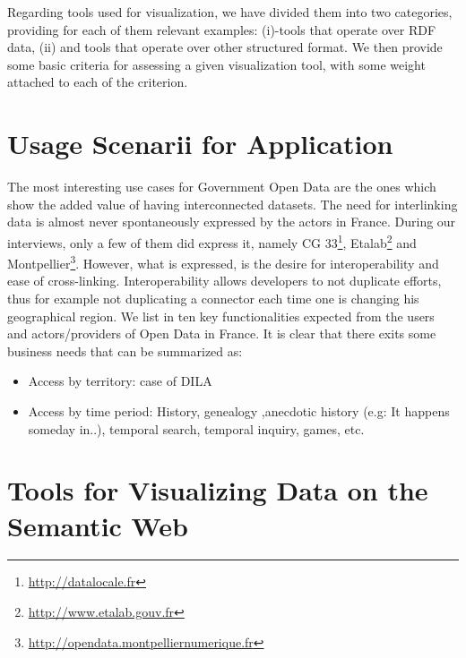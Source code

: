 \documentclass[a4paper,11pt]{report}
\begin{document}
Regarding tools used for visualization, we have divided them into two categories, providing for each of them relevant examples: (i)-tools that operate over RDF data, (ii) and tools that operate over other structured format. We then provide some basic criteria for assessing a given visualization tool, with some weight attached to each of the criterion. 


 \section{Usage Scenarii for Application}
 The most interesting use cases for Government Open Data are the ones which show the added value of having interconnected datasets. The need for interlinking data is almost never spontaneously expressed by the actors in France. During our interviews, only a few of them did express it, namely CG 33\footnote{\url{http://datalocale.fr}}, Etalab\footnote{\url{http://www.etalab.gouv.fr}} and Montpellier\footnote{\url{http://opendata.montpelliernumerique.fr}}. However, what is expressed, is the desire for interoperability and ease of cross-linking. Interoperability allows developers to not duplicate efforts, thus for example not duplicating a connector each time one is changing his geographical region. We list in \cite{deliverable2012a} ten key functionalities expected from the users and actors/providers of Open Data in France. It is clear that there exits some business needs that can be summarized as:
\begin{itemize}
\item Access by territory: case of DILA
\item Access by time period: History, genealogy ,anecdotic history (e.g: It happens someday in..), temporal search, temporal inquiry, games, etc.
\end{itemize}
 


\section{Tools for Visualizing Data on the Semantic Web}
 
\end{document}
